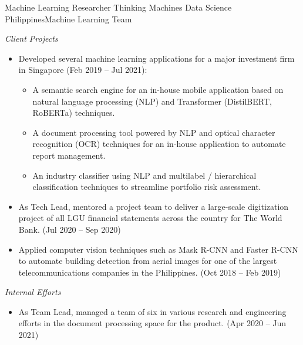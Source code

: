 \documentclass[12pt,a4paper]{moderncv}
\begin{document}
{Machine Learning Researcher}
{Thinking Machines Data Science}
{Philippines}{Machine Learning Team}
{
    \vspace{3px}
    \textit{Client Projects}
    \begin{itemize}
        \item Developed several machine learning applications for a major
            investment firm in Singapore (Feb 2019 -- Jul 2021): 
            \begin{itemize}
                \item A semantic search engine for an in-house mobile
                    application based on natural language processing (NLP) and
                    Transformer (DistilBERT, RoBERTa) techniques. 
                \item A document processing tool powered by NLP and optical
                    character recognition (OCR) techniques for an in-house
                    application to automate report management.
                \item An industry classifier using NLP and multilabel /
                    hierarchical classification techniques to streamline
                    portfolio risk assessment. 
            \end{itemize}
        \item As Tech Lead, mentored a project team to deliver a large-scale
            digitization project of all LGU financial statements across the
            country for The World Bank.  (Jul 2020 -- Sep 2020)
        \item Applied computer vision techniques such as Mask R-CNN and Faster
            R-CNN to automate building detection from aerial images for one of
            the largest telecommunications companies in the Philippines. (Oct
            2018 -- Feb 2019)
    \end{itemize}
    \vspace{3px}
    \textit{Internal Efforts}
    \begin{itemize}
        \item As Team Lead, managed a team of six in various research and
            engineering efforts in the document processing space for the
            {\color{blue}}
            product. (Apr 2020 -- Jun 2021)
    \end{itemize}
}

\end{document}
